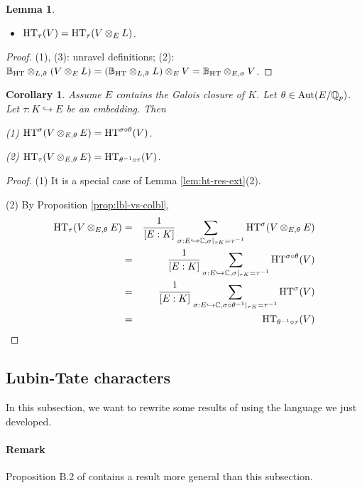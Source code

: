 \documentclass[10pt,a4paper,twoside]{article}
\newtheorem{lem}{Lemma}
\newtheorem{cor}{Corollary}
\begin{document}
\begin{appendix}
\begin{lem}
\begin{itemize}
\item 
[(3)]
${\operatorname{HT}}_{\tau}(V) = {\operatorname{HT}}_{\tau}(V\otimes_EL)$.
\end{itemize}
\end{lem}

\begin{proof}
(1), (3): unravel definitions;
(2):
$\mathbb{B}_{\operatorname{HT}}\otimes_{L, \tilde \sigma}(V\otimes_EL) = (\mathbb{B}_{\operatorname{HT}}\otimes_{L, \tilde \sigma}L)\otimes_{E}V
=\mathbb{B}_{\operatorname{HT}}\otimes_{E, \sigma}V$.
\end{proof}



\begin{cor}
\label{cor:galois-twist}
Assume $E$ contains the Galois closure of $K$.
Let $\theta\in \operatorname{Aut}(E/\mathbb{Q}_p)$.
Let $\tau: K\hookrightarrow E$ be an embedding.
Then

(1)
${\operatorname{HT}}^{\sigma}(V\otimes_{E, \theta}E) = {\operatorname{HT}}^{\sigma\circ \theta}(V)$.

(2)
${\operatorname{HT}}_{\tau}(V\otimes_{E, \theta}E) = {\operatorname{HT}}_{\theta^{-1}\circ\tau}(V)$.
\end{cor}

\begin{proof}
(1)
It is a special case of Lemma \ref{lem:ht-res-ext}(2).

(2)
By Proposition \ref{prop:lbl-vs-colbl},
\begin{eqnarray*}
{\operatorname{HT}}_{\tau}(V\otimes_{E,\theta}E) &=& 
\frac{1}{[E:K]}
\sum_{\sigma:E\hookrightarrow{\mathbb{C}}, \sigma|_{\tau K}=\tau^{-1}}{\operatorname{HT}}^{\sigma}(V\otimes_{E,\theta}E)\nonumber\\
&=&
\frac{1}{[E:K]}
\sum_{\sigma:E\hookrightarrow{\mathbb{C}}, \sigma|_{\tau K}=\tau^{-1}}{\operatorname{HT}}^{\sigma\circ \theta}(V)\nonumber\\
&=&
\frac{1}{[E:K]}
\sum_{\sigma:E\hookrightarrow{\mathbb{C}}, \sigma\circ\theta^{-1}|_{\tau K}=\tau^{-1}}{\operatorname{HT}}^{\sigma}(V)\nonumber\\
&=&
{\operatorname{HT}}_{\theta^{-1}\circ\tau}(V)\nonumber\qedhere
\end{eqnarray*}
\end{proof}

\subsection{Lubin-Tate characters}

In this subsection, we want to rewrite some results of
\cite[III.A.1-III.A.5]{Se89} using the language we just developed.


\paragraph{Remark}
Proposition B.2 of \cite[Appendix B]{C11} contains a result more general than this subsection.




\end{appendix}
\end{document}
